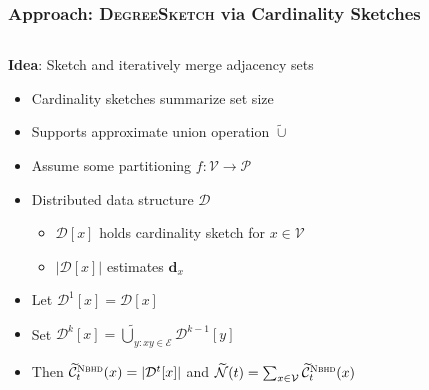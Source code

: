 \documentclass{beamer}
\newcommand{\algoname}[1]{\textnormal{\textsc{#1}}}
\begin{document}

\begin{frame}
\frametitle{Approach: \algoname{DegreeSketch} via Cardinality Sketches}


\begin{columns}
\begin{column}{0.65\textwidth}
	\textbf{Idea}: Sketch and iteratively merge adjacency sets
	\begin{itemize}
		\item Cardinality sketches summarize set size
		\item Supports approximate union operation $\widetilde{\cup}$
		\item Assume some partitioning $f : \mathcal{V} \rightarrow \mathcal{P}$
		\item Distributed data structure $\mathcal{D}$
		\begin{itemize}
			\item $\mathcal{D}[x]$ holds cardinality sketch for $x \in \mathcal{V}$
			\item $|\mathcal{D}[x]|$ estimates $\mathbf{d}_x$
		\end{itemize}
		\item Let $\mathcal{D}^1[x] = \mathcal{D}[x]$ 
		\item Set $\mathcal{D}^k[x] = \widetilde{\bigcup}_{y: xy \in \mathcal{E}} \mathcal{D}^{k-1}[y]$
		\item Then $\widetilde{\mathcal{C}}^{\algoname{Nbhd}}_t(x) = | \mathcal{D}^t[x]|$ and 
				$\widetilde{\mathcal{N}}(t) = \sum_{x \in \mathcal{V}} \widetilde{\mathcal{C}}^{\algoname{Nbhd}}_t(x)$
	\end{itemize}
\end{column}
\begin{column}{0.35\textwidth}  %
	\begin{center}

\end{center}
\end{column}
\end{columns}
\end{frame}
\end{document}
